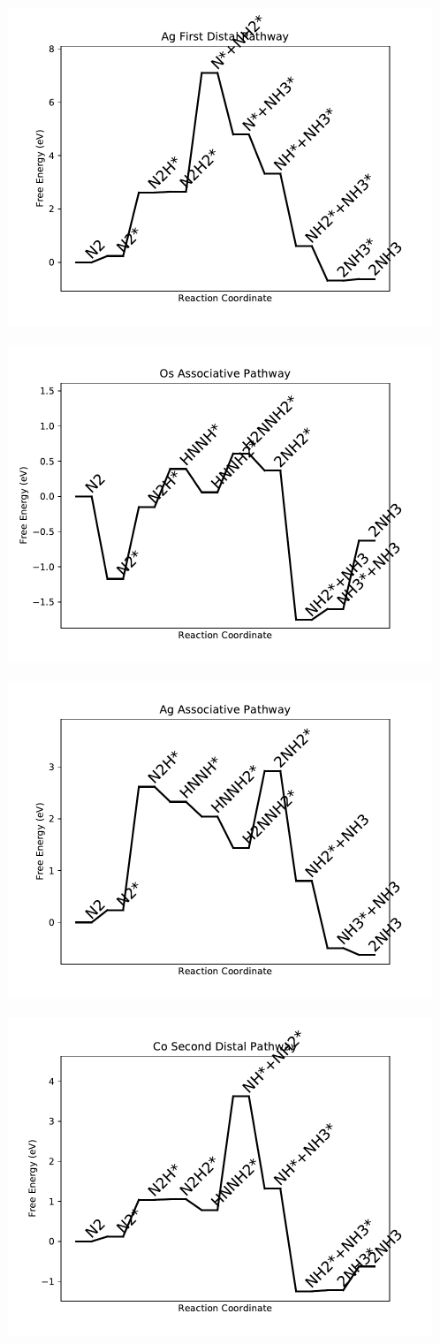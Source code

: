 \documentclass[journal=jacsat,manuscript=article]{achemso}
\begin{document}
\begin{figure}
\includegraphics[width=0.5\linewidth]{data/plots/Ag_distal_1.pdf}
\label{fig:Ag_distal_1}
\end{figure}

\begin{figure}
\includegraphics[width=0.5\linewidth]{data/plots/Os_associative.pdf}
\label{fig:Os_associative}
\end{figure}

\begin{figure}
\includegraphics[width=0.5\linewidth]{data/plots/Ag_associative.pdf}
\label{fig:Ag_associative}
\end{figure}

\begin{figure}
\includegraphics[width=0.5\linewidth]{data/plots/Co_distal_2.pdf}
\label{fig:Co_distal_2}
\end{figure}
\end{document}
